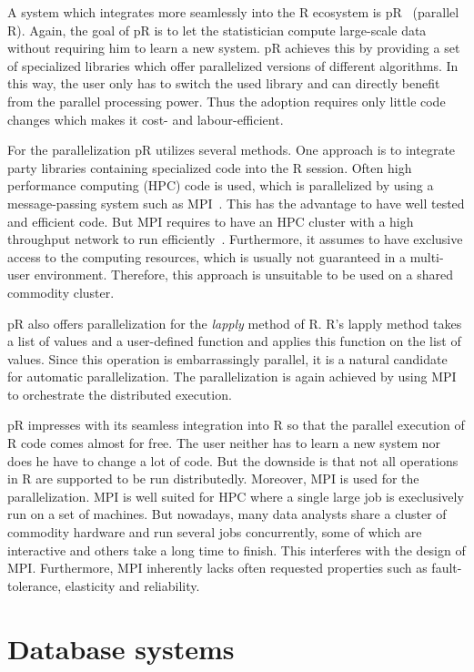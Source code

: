 A system which integrates more seamlessly into the R ecosystem is pR~\cite{samatova:2009a} (parallel R).
Again, the goal of pR is to let the statistician compute large-scale data without requiring him to learn a new system.
pR achieves this by providing a set of specialized libraries which offer parallelized versions of different algorithms.
In this way, the user only has to switch the used library and can directly benefit from the parallel processing power.
Thus the adoption requires only little code changes which makes it cost- and labour-efficient.

For the parallelization pR utilizes several methods.
One approach is to integrate  party libraries containing specialized code into the R session.
Often high performance computing (HPC) code is used, which is parallelized by using a message-passing system such as MPI~\cite{gropp:pc1996a,lusk:2009a}.
This has the advantage to have well tested and efficient code.
But MPI requires to have an HPC cluster with a high throughput network to run efficiently~\cite{sur:2006a}.
Furthermore, it assumes to have exclusive access to the computing resources, which is usually not guaranteed in a multi-user environment.
Therefore, this approach is unsuitable to be used on a shared commodity cluster.

pR also offers parallelization for the \emph{lapply} method of R.
R's lapply method takes a list of values and a user-defined function and applies this function on the list of values.
Since this operation is embarrassingly parallel, it is a natural candidate for automatic parallelization.
The parallelization is again achieved by using MPI to orchestrate the distributed execution.

pR impresses with its seamless integration into R so that the parallel execution of R code comes almost for free.
The user neither has to learn a new system nor does he have to change a lot of code.
But the downside is that not all operations in R are supported to be run distributedly.
Moreover, MPI is used for the parallelization.
MPI is well suited for HPC where a single large job is execlusively run on a set of machines.
But nowadays, many data analysts share a cluster of commodity hardware and run several jobs concurrently, some of which are interactive and others take a long time to finish.
This interferes with the design of MPI.
Furthermore, MPI inherently lacks often requested properties such as fault-tolerance, elasticity and reliability.

\section{Database systems}


